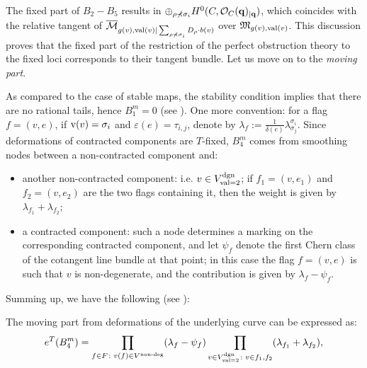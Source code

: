 The fixed part of $B_2-B_5$ results in $\oplus_{\rho\nprec\sigma_i}H^0(C,\mathcal{O}_C(\mathbf q)_{|\mathbf q})$, which coincides with the relative tangent of $\overline{\mathcal M}_{g(v),\operatorname{val}(v)|\sum_{\rho\nprec\sigma_i}D_\rho\cdot b(v)}$ over $\mathfrak M_{g(v),\operatorname{val}(v)}$. This discussion proves that the fixed part of the restriction of the perfect obstruction theory to the fixed loci corresponds to their tangent bundle. Let us move on to the \emph{moving part}.

As compared to the case of stable maps, the stability condition implies that there are no rational tails, hence $B_1^m=0$ (see \cite[Lemma 7.2]{HolgerSpielberg}). 
One more convention: for a flag $f=(v,e)$, if $\operatorname{v}(v)=\sigma_i$ and $\varepsilon(e)=\tau_{i,j}$, denote by $\lambda_f:=\frac{1}{\delta(e)}\lambda^{\sigma_i}_{\sigma_j}$.
Since deformations of contracted components are $T$-fixed, $B_4^m$ comes from smoothing nodes between a non-contracted component and:
\begin{itemize}
 \item another non-contracted component: i.e. $v\in V^\text{dgn}_{\operatorname{val}=2}$; if $f_1=(v,e_1)$ and $f_2=(v,e_2)$ are the two flags containing it, then the weight is given by $\lambda_{f_1}+\lambda_{f_2}$;
 \item a contracted component: such a node determines a marking on the corresponding contracted component, and let $\psi_f$ denote the first Chern class of the cotangent line bundle at that point; in this case the flag $f=(v,e)$ is such that $v$ is non-degenerate, and the contribution is given by $\lambda_f-\psi_f$.
\end{itemize}
Summing up, we have the following (see \cite[Lemma 7.3]{HolgerSpielberg}):
\begin{lem}
 The moving part from deformations of the underlying curve can be expressed as:
 \[
  e^T(B_4^m)=\prod_{f\in F\colon v(f)\in V^{\text{non-deg}}}(\lambda_f-\psi_f)\prod_{v\in V^\text{dgn}_{\operatorname{val}=2}\colon v\in f_1,f_2}(\lambda_{f_1}+\lambda_{f_2}),
 \]
\end{lem}


